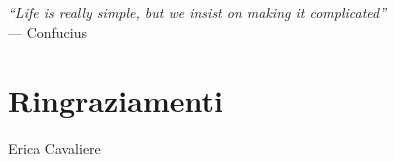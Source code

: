 \cleardoublepage
{}
{}

\begin{flushright}{
    \slshape
    ``Life is really simple, but we insist on making it complicated''} \\
    \medskip
    --- Confucius
\end{flushright}


\bigskip

\begingroup
\let\clearpage\relax
\let\cleardoublepage\relax
\let\cleardoublepage\relax

\chapter*{Ringraziamenti}

%
%
\bigskip

\hfill Erica Cavaliere

\endgroup
